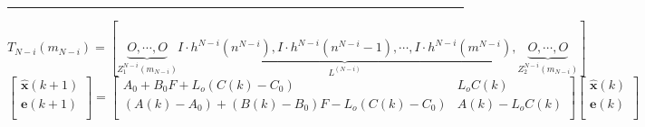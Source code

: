 \documentclass{Style/aas}
\begin{document}
\vskip1mm
\hrule
\begin{equation}
  T_{N-i}(m_{N-i})= \left[ \underbrace{O,\cdots,
    O}_{Z_1^{N-i}(m_{N-i})} \underbrace{I \cdot h^{N-i}(n^{N-i}), I
    \cdot h^{N-i}(n^{N-i}-1),\cdots, I \cdot
    h^{N-i}(m^{N-i})}_{L^{(N-i)}},\underbrace{O,\cdots,
    O}_{Z_2^{N-i}(m_{N-i})} \right]\tag{3}
\end{equation}
\begin{equation} \left[
    \begin{array}{c}
      \hat{{\pmb x}}(k+1) \\
      {\pmb e}(k+1)       \\
    \end{array}
    \right]=\left[
    \begin{array}{cc}
      A_0+B_0F+L_o(C(k)-C_0)               & L_oC(k)      \\
      (A(k)-A_0)+(B(k)-B_0)F-L_o(C(k)-C_0) & A(k)-L_oC(k) \\
    \end{array}
    \right]\left[
    \begin{array}{c}
      \hat{{\pmb x}}(k) \\
      {\pmb e} (k)      \\
    \end{array}
    \right]\tag{4}
\end{equation}
\begin{multicols}{2}%

\end{multicols}%
\end{document}
